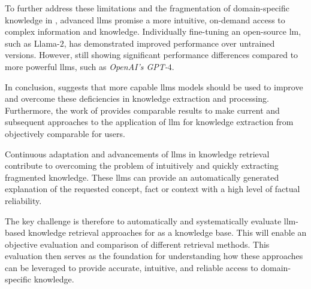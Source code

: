%
To further address these limitations and the fragmentation of domain-specific knowledge in \cite{bb2}, advanced \acp{llm} promise a more intuitive, on-demand access to complex information and knowledge.
Individually fine-tuning an open-source \ac{lm}, such as Llama-$2$, has demonstrated improved performance over untrained versions.
However, still showing significant performance differences compared to more powerful \acp{llm}, such as \textit{OpenAI's GPT-$4$}.

In conclusion, \citep{Paul_Keller} suggests that more capable \acp{llm} models should be used to improve and overcome these deficiencies in knowledge extraction and processing.
Furthermore, the work of \citet{Paul_Keller} provides comparable results to make current and subsequent approaches to the application of \ac{llm} for knowledge extraction from \citet{bb2} objectively comparable for users.
%

%
Continuous adaptation and advancements of \acp{llm} in knowledge retrieval contribute to overcoming the problem of intuitively and quickly extracting fragmented knowledge.
These \acp{llm} can provide an automatically generated explanation of the requested concept, fact or context with a high level of factual reliability.
%

%
The key challenge is therefore to automatically and systematically evaluate \ac{llm}-based knowledge retrieval approaches for \citet{bb2} as a knowledge base.
This will enable an objective evaluation and comparison of different retrieval methods.
This evaluation then serves as the foundation for understanding how these approaches can be leveraged to provide accurate, intuitive, and reliable access to domain-specific knowledge.
%
